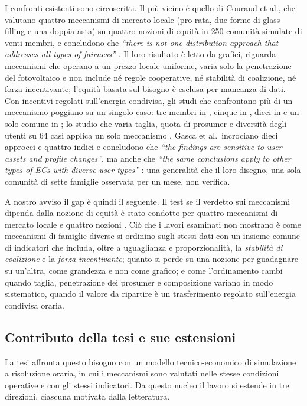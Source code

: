 I confronti esistenti sono circoscritti. Il più vicino è quello di Couraud et al., che valutano quattro meccanismi di mercato locale (pro-rata, due forme di glass-filling e una doppia asta) su quattro nozioni di equità in 250 comunità simulate di venti membri, e concludono che \textit{``there is not one distribution approach that addresses all types of fairness''} \cite{couraud2025}. Il loro risultato è letto da grafici, riguarda meccanismi che operano a un prezzo locale uniforme, varia solo la penetrazione del fotovoltaico e non include né regole cooperative, né stabilità di coalizione, né forza incentivante; l'equità basata sul bisogno è esclusa per mancanza di dati. Con incentivi regolati sull'energia condivisa, gli studi che confrontano più di un meccanismo poggiano su un singolo caso: tre membri in \cite{volpato2023}, cinque in \cite{trevisan2024}, dieci in \cite{fioriti2023} e un solo comune in \cite{campagna2024}; lo studio che varia taglia, quota di prosumer e diversità degli utenti su 64 casi applica un solo meccanismo \cite{ferrucci2025}. Gasca et al.\ incrociano dieci approcci e quattro indici e concludono che \textit{``the findings are sensitive to user assets and profile changes''}, ma anche che \textit{``the same conclusions apply to other types of ECs with diverse user types''} \cite{gasca2024}: una generalità che il loro disegno, una sola comunità di sette famiglie osservata per un mese, non verifica.

A nostro avviso il gap è quindi il seguente. Il test se il verdetto sui meccanismi dipenda dalla nozione di equità è stato condotto per quattro meccanismi di mercato locale e quattro nozioni \cite{couraud2025}. Ciò che i lavori esaminati non mostrano è come meccanismi di famiglie diverse si ordinino sugli stessi dati con un insieme comune di indicatori che includa, oltre a uguaglianza e proporzionalità, la \emph{stabilità di coalizione} e la \emph{forza incentivante}; quanto si perde su una nozione per guadagnare su un'altra, come grandezza e non come grafico; e come l'ordinamento cambi quando taglia, penetrazione dei prosumer e composizione variano in modo sistematico, quando il valore da ripartire è un trasferimento regolato sull'energia condivisa oraria.

\subsection*{Contributo della tesi e sue estensioni}

La tesi affronta questo bisogno con un modello tecnico-economico di simulazione a risoluzione oraria, in cui i meccanismi sono valutati nelle stesse condizioni operative e con gli stessi indicatori. Da questo nucleo il lavoro si estende in tre direzioni, ciascuna motivata dalla letteratura.

